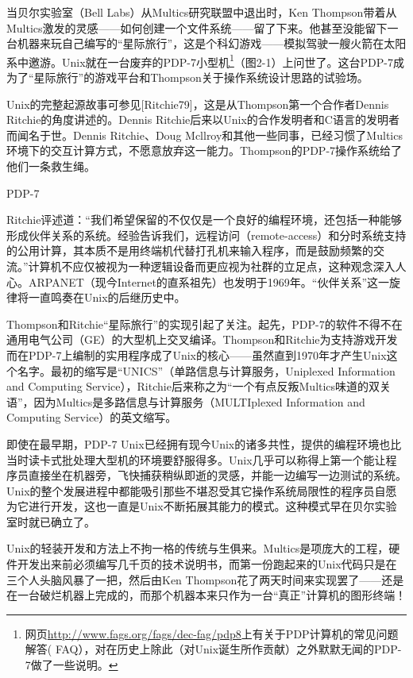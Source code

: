 \documentclass[12pt,oneside]{book}
\begin{document}
\begin{common-format}
当贝尔实验室（Bell Labs）从Multics研究联盟中退出时，Ken Thompson带着从Multics激发的灵感——如何创建一个文件系统——留了下来。他甚至没能留下一台机器来玩自己编写的“星际旅行”，这是个科幻游戏——模拟驾驶一艘火箭在太阳系中邀游。Unix就在一台废弃的PDP-7小型机\footnote{网页\href{http://www.fags.org/fags/dec-fag/pdp8}{http://www.fags.org/fags/dec-fag/pdp8}上有关于PDP计算机的常见问题解答( FAQ），对在历史上除此（对Unix诞生所作贡献）之外默默无闻的PDP-7做了一些说明。}（图2-1）上问世了。这台PDP-7成为了“星际旅行”的游戏平台和Thompson关于操作系统设计思路的试验场。

Unix的完整起源故事可参见[Ritchie79]，这是从Thompson第一个合作者Dennis Ritchie的角度讲述的。Dennis Ritchie后来以Unix的合作发明者和C语言的发明者而闻名于世。Dennis Ritchie、Doug Mcllroy和其他一些同事，已经习惯了Multics环境下的交互计算方式，不愿意放弃这一能力。Thompson的PDP-7操作系统给了他们一条救生绳。

\begin{fig}[2]{PDP-7}
\label{fig:PDP-7}
\end{fig}

Ritchie评述道：“我们希望保留的不仅仅是一个良好的编程环境，还包括一种能够形成伙伴关系的系统。经验告诉我们，远程访问（remote-access）和分时系统支持的公用计算，其本质不是用终端机代替打孔机来输入程序，而是鼓励频繁的交流。”计算机不应仅被视为一种逻辑设备而更应视为社群的立足点，这种观念深入人心。ARPANET（现今Internet的直系祖先）也发明于1969年。“伙伴关系”这一旋律将一直鸣奏在Unix的后继历史中。

Thompson和Ritchie“星际旅行”的实现引起了关注。起先，PDP-7的软件不得不在通用电气公司（GE）的大型机上交叉编译。Thompson和Ritchie为支持游戏开发而在PDP-7上编制的实用程序成了Unix的核心——虽然直到1970年才产生Unix这个名字。最初的缩写是“UNICS”（单路信息与计算服务，Uniplexed Information and Computing Service），Ritchie后来称之为“一个有点反叛Multics味道的双关语”，因为Multics是多路信息与计算服务（MULTIplexed Information and Computing Service）的英文缩写。

即使在最早期，PDP-7 Unix已经拥有现今Unix的诸多共性，提供的编程环境也比当时读卡式批处理大型机的环境要舒服得多。Unix几乎可以称得上第一个能让程序员直接坐在机器旁，飞快捕获稍纵即逝的灵感，并能一边编写一边测试的系统。Unix的整个发展进程中都能吸引那些不堪忍受其它操作系统局限性的程序员自愿为它进行开发，这也一直是Unix不断拓展其能力的模式。这种模式早在贝尔实验室时就已确立了。

Unix的轻装开发和方法上不拘一格的传统与生俱来。Multics是项庞大的工程，硬件开发出来前必须编写几千页的技术说明书，而第一份跑起来的Unix代码只是在三个人头脑风暴了一把，然后由Ken Thompson花了两天时间来实现罢了——还是在一台破烂机器上完成的，而那个机器本来只作为一台“真正”计算机的图形终端！


\end{common-format}
\end{document}
